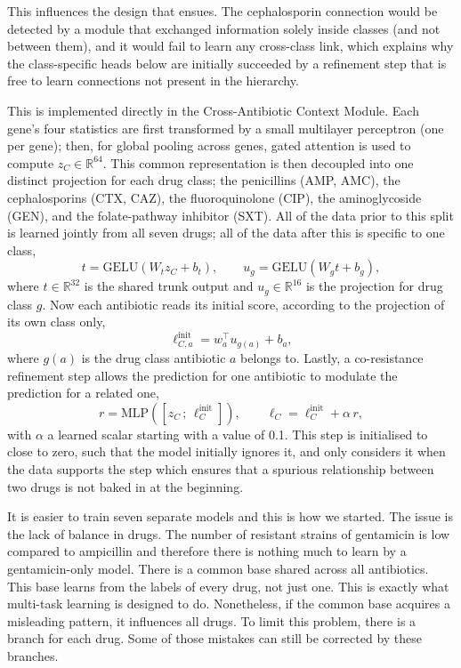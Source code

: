 \documentclass[journal]{IEEEtran}
\begin{document}
This influences the design that ensues. The cephalosporin connection would be
detected by a module that exchanged information solely inside classes (and not
between them), and it would fail to learn any cross-class link, which explains why
the class-specific heads below are initially succeeded by a refinement step that is
free to learn connections not present in the hierarchy.

This is implemented directly in the Cross-Antibiotic Context Module. Each gene's four
statistics are first transformed by a small multilayer perceptron (one per gene);
then, for global pooling across genes, gated attention is used to compute
$z_C \in \mathbb{R}^{64}$. This common representation is then decoupled into one
distinct projection for each drug class; the penicillins (AMP, AMC), the
cephalosporins (CTX, CAZ), the fluoroquinolone (CIP), the aminoglycoside (GEN), and
the folate-pathway inhibitor (SXT). All of the data prior to this split is learned
jointly from all seven drugs; all of the data after this is specific to one class,
\begin{equation}
t = \mathrm{GELU}(W_t z_C + b_t), \qquad
u_g = \mathrm{GELU}(W_g t + b_g),
\label{eq:expertC_trunk}
\end{equation}
where $t \in \mathbb{R}^{32}$ is the shared trunk output and
$u_g \in \mathbb{R}^{16}$ is the projection for drug class $g$. Now each antibiotic
reads its initial score, according to the projection of its own class only,
\begin{equation}
\ell^{\mathrm{init}}_{C,a} = w_a^\top u_{g(a)} + b_a,
\label{eq:expertC_ablogit}
\end{equation}
where $g(a)$ is the drug class antibiotic $a$ belongs to. Lastly, a co-resistance
refinement step allows the prediction for one antibiotic to modulate the prediction
for a related one,
\begin{equation}
r = \mathrm{MLP}\!\left(\left[z_C \, ; \, \ell^{\mathrm{init}}_{C}\right]\right),
\qquad
\ell_C = \ell^{\mathrm{init}}_{C} + \alpha\, r,
\label{eq:expertC_cores}
\end{equation}
with $\alpha$ a learned scalar starting with a value of 0.1. This step is initialised
to close to zero, such that the model initially ignores it, and only considers it
when the data supports the step which ensures that a spurious relationship between
two drugs is not baked in at the beginning.

It is easier to train seven separate models and this is how we started. The issue is
the lack of balance in drugs. The number of resistant strains of gentamicin is low
compared to ampicillin and therefore there is nothing much to learn by a
gentamicin-only model. There is a common base shared across all antibiotics. This
base learns from the labels of every drug, not just one. This is exactly what
multi-task learning is designed to do. Nonetheless, if the common base acquires a
misleading pattern, it influences all drugs. To limit this problem, there is a branch
for each drug. Some of those mistakes can still be corrected by these branches.
\end{document}
